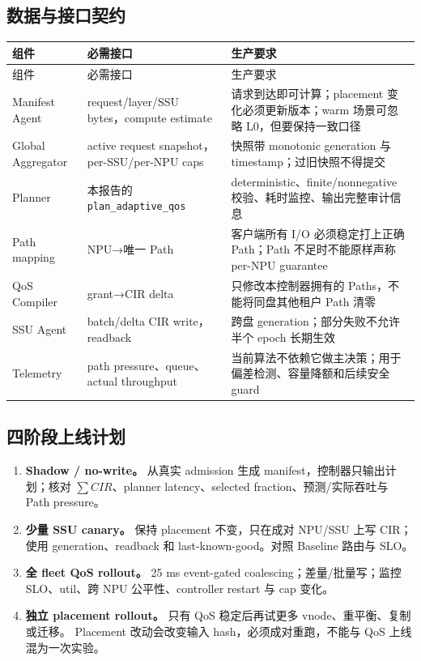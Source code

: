 \documentclass[UTF8,fontset=none,10pt,a4paper]{ctexart}
\newcommand{\code}[1]{\texttt{\small #1}}
\begin{document}
\subsection{数据与接口契约}

\begin{longtable}{p{38mm}p{47mm}p{76mm}}
\toprule
组件 & 必需接口 & 生产要求\\
\midrule
\endfirsthead
\toprule
组件 & 必需接口 & 生产要求\\
\midrule
\endhead
Manifest Agent & request/layer/SSU bytes，compute estimate & 请求到达即可计算；placement 变化必须更新版本；warm 场景可忽略 L0，但要保持一致口径\\
Global Aggregator & active request snapshot，per-SSU/per-NPU caps & 快照带 monotonic generation 与 timestamp；过旧快照不得提交\\
Planner & 本报告的 \code{plan\_adaptive\_qos} & deterministic、finite/nonnegative 校验、耗时监控、输出完整审计信息\\
Path mapping & NPU→唯一 Path & 客户端所有 I/O 必须稳定打上正确 Path；Path 不足时不能原样声称 per-NPU guarantee\\
QoS Compiler & grant→CIR delta & 只修改本控制器拥有的 Paths，不能将同盘其他租户 Path 清零\\
SSU Agent & batch/delta CIR write，readback & 跨盘 generation；部分失败不允许半个 epoch 长期生效\\
Telemetry & path pressure、queue、actual throughput & 当前算法不依赖它做主决策；用于偏差检测、容量降额和后续安全 guard\\
\bottomrule
\end{longtable}

\subsection{四阶段上线计划}

\begin{enumerate}[label=\textcolor{Blue}{\bfseries\sffamily\arabic*.},leftmargin=2.3em,itemsep=5pt]
  \item \textbf{Shadow / no-write。} 从真实 admission 生成 manifest，控制器只输出计划；核对
    $\sum CIR$、planner latency、selected fraction、预测/实际吞吐与 Path pressure。
  \item \textbf{少量 SSU canary。} 保持 placement 不变，只在成对 NPU/SSU 上写 CIR；使用
    generation、readback 和 last-known-good。对照 Baseline 路由与 SLO。
  \item \textbf{全 fleet QoS rollout。} 25 ms event-gated coalescing；差量/批量写；监控
    SLO、util、跨 NPU 公平性、controller restart 与 cap 变化。
  \item \textbf{独立 placement rollout。} 只有 QoS 稳定后再试更多 vnode、重平衡、复制或迁移。
    Placement 改动会改变输入 hash，必须成对重跑，不能与 QoS 上线混为一次实验。
\end{enumerate}
\end{document}
